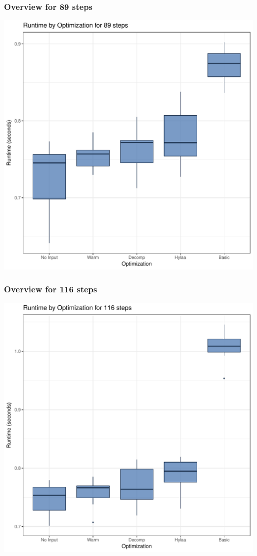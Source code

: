 \documentclass{article}\usepackage[]{graphicx}\usepackage[]{color}
\makeatletter
\def\maxwidth{ %
  \ifdim\Gin@nat@width>\linewidth
    \linewidth
  \else
    \Gin@nat@width
  \fi
}
\newenvironment{knitrout}{}{} %
\makeatother
\begin{document}
\subsubsection{Overview for 89 steps}
\begin{knitrout}
\color{fgcolor}
\includegraphics[width=\maxwidth]{figure/steps89-1} 

\end{knitrout}
\subsubsection{Overview for 116 steps}
\begin{knitrout}
\color{fgcolor}
\includegraphics[width=\maxwidth]{figure/steps116-1} 

\end{knitrout}
\end{document}
